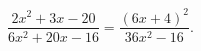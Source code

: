 \begin{ex}[type=equation]
	\begin{condition}
		$\dfrac{2x^2 + 3x -20}{6x^2 + 20x - 16} = \dfrac{(6x + 4)^2}{36x^2 - 16}.$
	\end{condition}
\end{ex}
